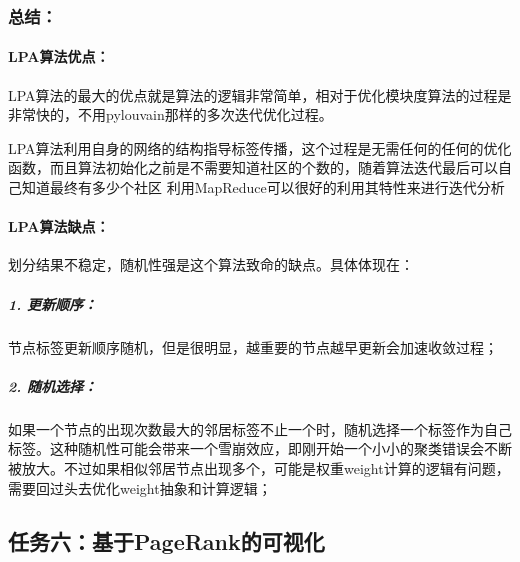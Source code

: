 \documentclass[a4paper,UTF8]{article}
\numberwithin{equation}{section}
\begin{document}
\subsubsection{总结：}
\paragraph{LPA算法优点：}
\par LPA算法的最大的优点就是算法的逻辑非常简单，相对于优化模块度算法的过程是非常快的，不用pylouvain那样的多次迭代优化过程。
\par LPA算法利用自身的网络的结构指导标签传播，这个过程是无需任何的任何的优化函数，而且算法初始化之前是不需要知道社区的个数的，随着算法迭代最后可以自己知道最终有多少个社区
利用MapReduce可以很好的利用其特性来进行迭代分析
\paragraph{LPA算法缺点：}
\par 划分结果不稳定，随机性强是这个算法致命的缺点。具体体现在：
\subparagraph{1. 更新顺序：}
节点标签更新顺序随机，但是很明显，越重要的节点越早更新会加速收敛过程；
\subparagraph{2. 随机选择：}
如果一个节点的出现次数最大的邻居标签不止一个时，随机选择一个标签作为自己标签。这种随机性可能会带来一个雪崩效应，即刚开始一个小小的聚类错误会不断被放大。不过如果相似邻居节点出现多个，可能是权重weight计算的逻辑有问题，需要回过头去优化weight抽象和计算逻辑；

\subsection{任务六：基于PageRank的可视化}
\end{document}
